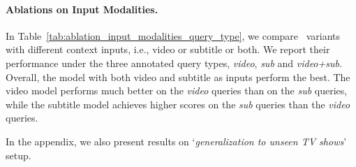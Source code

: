 \paragraph{Ablations on Input Modalities.}
In Table~\ref{tab:ablation_input_modalities_query_type}, we compare \ModelName~variants with different context inputs, i.e., video or subtitle or both.
We report their performance under the three annotated query types, \textit{video}, \textit{sub} and \textit{video+sub}.
Overall, the model with both video and subtitle as inputs perform the best.
The video model performs much better on the \textit{video} queries than on the \textit{sub} queries, while the subtitle model achieves higher scores on the \textit{sub} queries than the \textit{video} queries.

In the appendix, we also present results on `\textit{generalization to unseen TV shows}' setup. 

\begin{table}[!t]
\centering
\small
\setlength{\tabcolsep}{2pt}
\renewcommand{\arraystretch}{1.05}
\caption{\ModelName~performance breakdown on \DsetName~\textit{val} set by query types, with different inputs. }
\label{tab:ablation_input_modalities_query_type}
\end{table}

